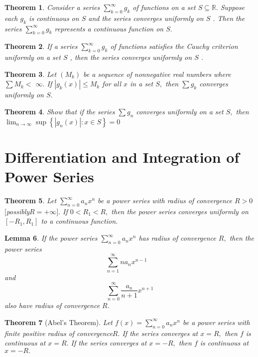 \documentclass[12pt]{article}
\newtheorem{theorem}{Theorem}[section]
\newtheorem{lemma}[theorem]{Lemma}
\begin{document}
\begin{theorem}
	Consider a series $\sum _ { k = 0 } ^ { \infty } g _ { k }$ of functions on a set $S \subseteq \mathbb { R } .$ Suppose
	each $g _ { k }$ is continuous on $S$ and the series converges uniformly on $S$ .
	Then the series $\sum _ { k = 0 } ^ { \infty } g _ { k }$ represents a continuous function on $S .$
\end{theorem}
\begin{theorem}
	If a series $\sum _ { k = 0 } ^ { \infty } g _ { k }$ of functions satisfies the Cauchy criterion
	uniformly on a set $S$ , then the series converges uniformly on $S$ .
\end{theorem}
\begin{theorem}
	Let $\left( M _ { k } \right)$ be a sequence of nonnegative real numbers where $\sum M _ { k } <$
	$\infty .$ If $\left| g _ { k } ( x ) \right| \leq M _ { k }$ for all $x$ in a set $S ,$ then $\sum g _ { k }$ converges
	uniformly on $S .$
\end{theorem}
\begin{theorem}
	Show that if the series $\sum g _ { n }$ converges uniformly on a set $S ,$ then
	$\lim _ { n \rightarrow \infty } \sup \left\{ \left| g _ { n } ( x ) \right| : x \in S \right\} = 0$
\end{theorem}

\section{Differentiation and Integration of Power Series}
\begin{theorem}
	Let $\sum _ { n = 0 } ^ { \infty } a _ { n } x ^ { n }$ be a power series with radius of convergence $R > 0$
	$[$possibly$R = + \infty ] .$ If $0 < R _ { 1 } < R ,$ then the power series converges
	uniformly on $\left[ - R _ { 1 } , R _ { 1 } \right]$ to a continuous function.
\end{theorem}
\begin{lemma}
	If the power series $\sum _ { n = 0 } ^ { \infty } a _ { n } x ^ { n }$ has radius of convergence $R ,$ then the
	power series
	$$\sum _ { n = 1 } ^ { \infty } n a _ { n } x ^ { n - 1 } \quad$$ and $$\sum _ { n = 0 } ^ { \infty } \frac { a _ { n } } { n + 1 } x ^ { n + 1 }$$ also have radius of convergence $R .$
\end{lemma}

\begin{theorem}[Abel’s Theorem]
	Let $f ( x ) = \sum _ { n = 0 } ^ { \infty } a _ { n } x ^ { n }$ be a power series with finite positive radius of
	convergence$R .$ If the series converges at $x = R ,$ then $f$ is continuous
	at $x = R .$ If the series converges at $x = - R ,$ then $f$ is continuous
	at $x = - R .$
\end{theorem}
\end{document}
